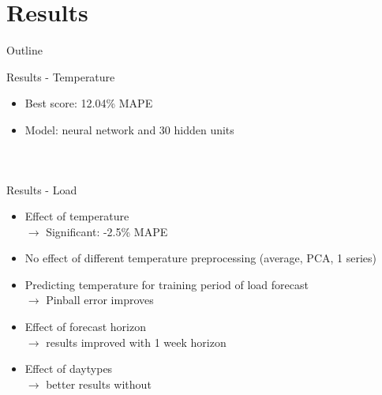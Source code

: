 \documentclass{beamer}
\begin{document}
\section{Results}
\begin{frame}[noframenumbering]{Outline}
\tableofcontents[currentsection]
\end{frame}
\begin{frame}{Results - Temperature}
\begin{itemize}
\item Best score: 12.04\% MAPE
\pause
\item Model: neural network and 30 hidden units
\end{itemize}
\begin{columns}[c] %
        \begin{figure}
		\centering
		\end{figure}
	    \begin{figure}
		\centering
		\hspace*{-3em}
		\end{figure}
\end{columns}
\end{frame}


\begin{frame}{Results - Load}
\begin{itemize}
\item Effect of temperature\\
$\rightarrow$ Significant: -2.5\% MAPE
\pause
\item No effect of different temperature preprocessing (average, PCA, 1 series)
\pause
\item Predicting temperature for training period of load forecast\\
$\rightarrow$ Pinball error improves
\pause
\item Effect of forecast horizon\\
$\rightarrow$ results improved with 1 week horizon %
\pause
\item Effect of daytypes\\
$\rightarrow$ better results without
\end{itemize}
\end{frame}
\end{document}
